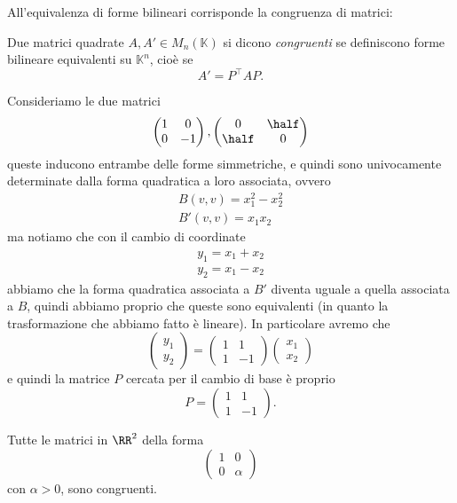 \documentclass[11pt]{scrartcl}
\newcommand{\KK}{\mathbb{K}}
\begin{document}
	All'equivalenza di forme bilineari corrisponde la congruenza di matrici:
	\begin{definition}
		Due matrici quadrate $A,A'\in M_n(\KK)$ si dicono \textit{congruenti} se definiscono forme bilineare equivalenti su $\KK^n$, cioè se 
		$$A'=P^\intercal A P.$$
	\end{definition}
	\begin{example}
		Consideriamo le due matrici
		$$\begin{pmatrix}
			1 & 0 \\
			0 & -1
		\end{pmatrix},
		\begin{pmatrix}
			0 & \half \\
			\half & 0
		\end{pmatrix}
		$$
		queste inducono entrambe delle forme simmetriche, e quindi sono univocamente determinate dalla forma quadratica a loro associata, ovvero
		\begin{gather*}
			B(v,v) = x_1^2-x_2^2 \\
			B'(v,v)= x_1x_2
		\end{gather*}
		ma notiamo che con il cambio di coordinate
		\begin{gather*}
			y_1 = x_1 + x_ 2 \\
			y_2 = x_1 - x_2
		\end{gather*}
		abbiamo che la forma quadratica associata a $B'$ diventa uguale a quella associata a $B$, quindi abbiamo proprio che queste sono equivalenti (in quanto la trasformazione che abbiamo fatto è lineare). In particolare avremo che 
		$$
		\begin{pmatrix}
			y_1 \\
			y_2
		\end{pmatrix}
		=
		\begin{pmatrix}
			1 & 1 \\
			1 & -1 
		\end{pmatrix}
		\begin{pmatrix}
			x_1 \\
			x_2 
		\end{pmatrix}
		$$
		e quindi la matrice $P$ cercata per il cambio di base è proprio
		$$
		P=
		\begin{pmatrix}
			1 & 1 \\
			1 & -1
		\end{pmatrix}.
		$$
	\end{example}
	\begin{example}[Congruenza in $\RR^2$]
		Tutte le matrici in $\RR^2$ della forma 
		$$\begin{pmatrix}
			1 & 0 \\
			0 & \alpha
		\end{pmatrix}$$
		con $\alpha>0$, sono congruenti.
	\end{example}
\end{document}
